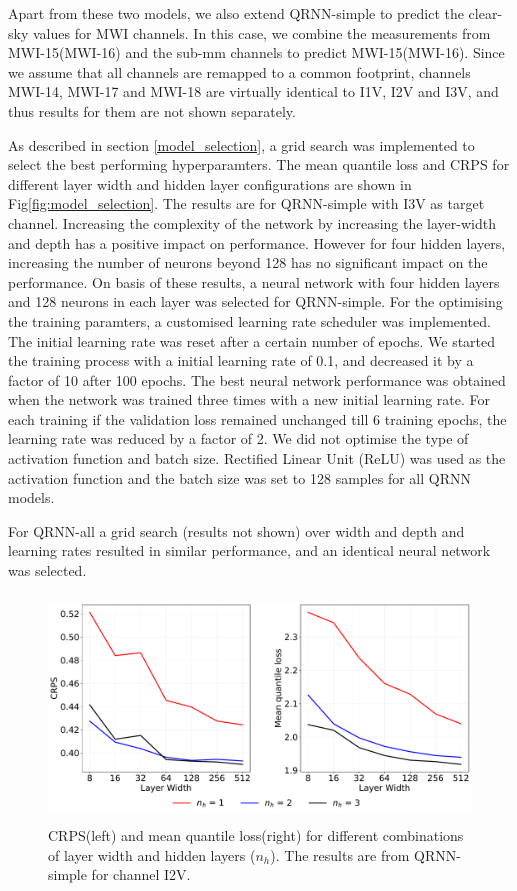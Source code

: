 \documentclass[amt, manuscript]{copernicus}
\begin{document}
Apart from these two models, we also extend QRNN-simple to predict the clear-sky values for MWI channels. In this case, we combine the measurements from MWI-15(MWI-16) and the sub-mm channels to predict MWI-15(MWI-16). Since we assume that all channels are remapped to a common footprint, channels MWI-14, MWI-17 and MWI-18 are virtually identical to I1V, I2V and I3V, and thus results for them are not shown separately. 

As described in section \ref{model_selection}, a grid search was implemented to select the best performing hyperparamters. The mean quantile loss and CRPS for different layer width and hidden layer configurations are shown in Fig\ref{fig:model_selection}. The results are for QRNN-simple with I3V as target channel. Increasing the complexity of the network by increasing the layer-width and depth has a positive impact on performance. However for four hidden layers, increasing the number of neurons beyond 128 has no significant impact on the performance. On basis of these results, a neural network with four hidden layers and 128 neurons in each layer was selected for QRNN-simple. For the optimising the training paramters, a customised  learning rate scheduler was implemented. The initial learning rate was reset after a certain number of epochs.  We started the training process with a initial learning rate of 0.1, and decreased it by a factor of 10 after 100 epochs. The best neural network performance was obtained when the network was trained three times with a new initial learning rate. For each training  if the validation loss remained unchanged till 6 training epochs, the learning rate was reduced by a factor of 2. We did not optimise the type of activation function and batch size. Rectified Linear Unit (ReLU) was used as the activation function  and the batch size was set to 128 samples for all QRNN models. 

For QRNN-all a grid search (results not shown) over width and depth and learning rates resulted in similar performance, and an identical neural network was selected.

\begin{figure}[t]
	\centering
	\includegraphics[height=60mm]{Figures/CRPS.pdf} 
	\caption{CRPS(left) and mean quantile loss(right) for different combinations of layer width and hidden layers ($n_h$). The results are from QRNN-simple for channel I2V.}
	\label{fig:}	
\end{figure}
\end{document}
